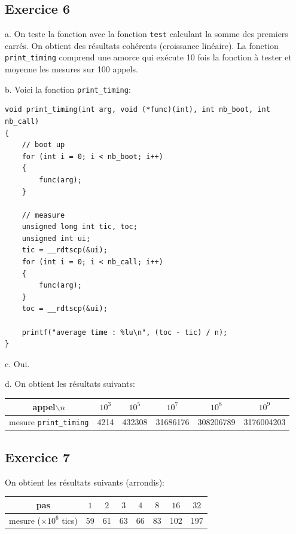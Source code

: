 \documentclass[11pt, a4 paper]{article}
\begin{document}
\subsection{Exercice 6}
a. On teste la fonction avec la fonction \texttt{test} calculant la somme des premiers carrés. On obtient des résultats cohérents (croissance linéaire).
La fonction \texttt{print\_timing} comprend une amorce qui exécute 10 fois la fonction à tester et moyenne les mesures sur 100 appels.

b. Voici la fonction \texttt{print\_timing}:

\begin{lstlisting}[style=CStyle]
void print_timing(int arg, void (*func)(int), int nb_boot, int nb_call)
{
    // boot up
    for (int i = 0; i < nb_boot; i++)
    {
        func(arg);
    }

    // measure
    unsigned long int tic, toc;
    unsigned int ui;
    tic = __rdtscp(&ui);
    for (int i = 0; i < nb_call; i++)
    {
        func(arg);
    }
    toc = __rdtscp(&ui);

    printf("average time : %lu\n", (toc - tic) / n);
}
\end{lstlisting}

c. Oui.

d. On obtient les résultats suivants:
\begin{center}
    \begin{tabular}{| c | c | c | c | c | c |}
        \hline
    appel$\backslash n$ & $10^3$ & $10^5$ & $10^7$ & $10^8$ & $10^9$ \\
        \hline
        mesure \texttt{print\_timing} & 4214 & 432308 & 31686176 & 308206789 & 3176004203\\ 
        \hline
    \end{tabular}
\end{center}

\subsection{Exercice 7}
On obtient les résultats suivants (arrondis):
\begin{center}
    \begin{tabular}{| c | c | c | c | c | c | c | c |}
        \hline
        pas & $1$ & $2$ & $3$ & $4$ & $8$ & $16$ & $32$ \\
        \hline
        mesure ($\times 10^6$ tics)& 59 & 61 & 63 & 66 & 83 & 102 & 197 \\ 
        \hline
    \end{tabular}
\end{center}
\end{document}
